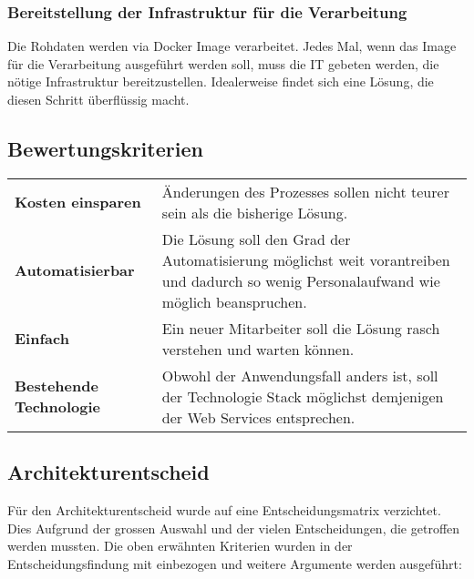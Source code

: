 \subsubsection{Bereitstellung der Infrastruktur für die Verarbeitung}
Die Rohdaten werden via Docker Image verarbeitet. Jedes Mal, wenn das Image für die Verarbeitung ausgeführt werden soll, muss die IT gebeten werden, die nötige Infrastruktur bereitzustellen. Idealerweise findet sich eine Lösung, die diesen Schritt überflüssig macht.


\subsection{Bewertungskriterien}
\begin{tabular}{p{}p{}}
    \textbf{Kosten einsparen} & Änderungen des Prozesses sollen nicht teurer sein als die bisherige Lösung.\\
    \textbf{Automatisierbar} & Die Lösung soll den Grad der Automatisierung möglichst weit vorantreiben und dadurch so wenig Personalaufwand wie möglich beanspruchen.\\
    \textbf{Einfach} & Ein neuer Mitarbeiter soll die Lösung rasch verstehen und warten können.\\
    \textbf{Bestehende Technologie} & Obwohl der Anwendungsfall anders ist, soll der Technologie Stack möglichst demjenigen der Web Services entsprechen.\\
\end{tabular}

\subsection{Architekturentscheid}
Für den Architekturentscheid wurde auf eine Entscheidungsmatrix verzichtet. Dies Aufgrund der grossen Auswahl und der vielen Entscheidungen, die getroffen werden mussten. Die oben erwähnten Kriterien wurden in der Entscheidungsfindung mit einbezogen und weitere Argumente werden ausgeführt:

